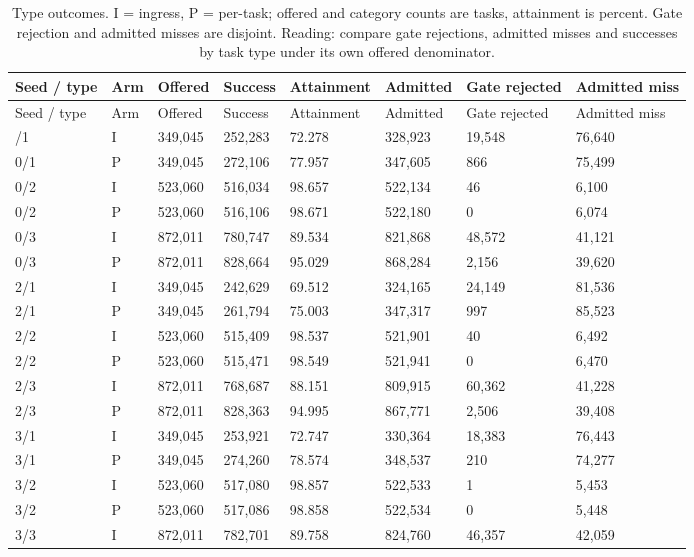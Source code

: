 \documentclass[12pt,a4paper]{article}
\begin{document}
\begingroup
\singlespacing\footnotesize\setlength{\tabcolsep}{3pt}
\renewcommand{\thetable}{D1}
\begin{xltabular}{\textwidth}{@{}YYYYYYYY@{}}
\caption[Type outcomes]{Type outcomes. I = ingress, P = per-task; offered and category counts are tasks, attainment is percent. Gate rejection and admitted misses are disjoint. Reading: compare gate rejections, admitted misses and successes by task type under its own offered denominator.}\label{tab:D1} \\
\toprule
Seed / type & Arm & Offered & Success & Attainment & Admitted & Gate rejected & Admitted miss \\
\midrule\endfirsthead
\toprule
Seed / type & Arm & Offered & Success & Attainment & Admitted & Gate rejected & Admitted miss \\
\midrule\endhead
\bottomrule{}/1 & I & 349,045 & 252,283 & 72.278 & 328,923 & 19,548 & 76,640 \\
0/1 & P & 349,045 & 272,106 & 77.957 & 347,605 & 866 & 75,499 \\
0/2 & I & 523,060 & 516,034 & 98.657 & 522,134 & 46 & 6,100 \\
0/2 & P & 523,060 & 516,106 & 98.671 & 522,180 & 0 & 6,074 \\
0/3 & I & 872,011 & 780,747 & 89.534 & 821,868 & 48,572 & 41,121 \\
0/3 & P & 872,011 & 828,664 & 95.029 & 868,284 & 2,156 & 39,620 \\
2/1 & I & 349,045 & 242,629 & 69.512 & 324,165 & 24,149 & 81,536 \\
2/1 & P & 349,045 & 261,794 & 75.003 & 347,317 & 997 & 85,523 \\
2/2 & I & 523,060 & 515,409 & 98.537 & 521,901 & 40 & 6,492 \\
2/2 & P & 523,060 & 515,471 & 98.549 & 521,941 & 0 & 6,470 \\
2/3 & I & 872,011 & 768,687 & 88.151 & 809,915 & 60,362 & 41,228 \\
2/3 & P & 872,011 & 828,363 & 94.995 & 867,771 & 2,506 & 39,408 \\
3/1 & I & 349,045 & 253,921 & 72.747 & 330,364 & 18,383 & 76,443 \\
3/1 & P & 349,045 & 274,260 & 78.574 & 348,537 & 210 & 74,277 \\
3/2 & I & 523,060 & 517,080 & 98.857 & 522,533 & 1 & 5,453 \\
3/2 & P & 523,060 & 517,086 & 98.858 & 522,534 & 0 & 5,448 \\
3/3 & I & 872,011 & 782,701 & 89.758 & 824,760 & 46,357 & 42,059 \\

\end{xltabular}
\end{document}
